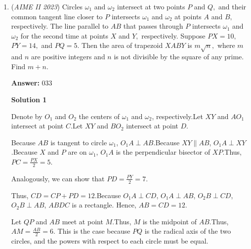 \begin{enumerate}
 Let $x$ be an $n$th root of unity, so $x^n = 1$.

 Factor $a^n - 1$ as $(a-1)(a-x)(a-x^2) \cdots (a-x^{n-1}) \square$.

 For each term in the product, factor out $-1$ in each product to obtain $(-1)^{n}\cdot (1-a)(x-a)(x^2-a)(x^3-a)(...)(x^{n-1}-a)$.

 Because $n=7$, we have the term $(-1)^{7} = -1$.

 Now, note that each $a$ term is a root of unity! This is because $a=1$, and that must correspond to some $x$ power. However, $x$ is also a root of unity! Thus, $a$ must also be a root of unity. Then, because $n=7$, our final rewritten form is $-(a^7-1)$.

 So, for our case

 


	\item (\textit{AIME II 2023}) Circles $\omega_1$ and $\omega_2$ intersect at two points $P$ and $Q,$ and their common tangent line closer to $P$ intersects $\omega_1$ and $\omega_2$ at points $A$ and $B,$ respectively. The line parallel to $AB$ that passes through $P$ intersects $\omega_1$ and $\omega_2$ for the second time at points $X$ and $Y,$ respectively. Suppose $PX=10,$ $PY=14,$ and $PQ=5.$ Then the area of trapezoid $XABY$ is $m\sqrt{n},$ where $m$ and $n$ are positive integers and $n$ is not divisible by the square of any prime. Find $m+n.$

 \textbf{Answer: }033



\textbf{Solution 1}

Denote by $O_1$ and $O_2$ the centers of $\omega_1$ and $\omega_2$, respectively.Let $XY$ and $AO_1$ intersect at point $C$.Let $XY$ and $BO_2$ intersect at point $D$.

 Because $AB$ is tangent to circle $\omega_1$, $O_1 A \perp AB$.Because $XY \parallel AB$, $O_1 A \perp XY$.Because $X$ and $P$ are on $\omega_1$, $O_1A$ is the perpendicular bisector of $XP$.Thus, $PC = \frac{PX}{2} = 5$.

 Analogously, we can show that $PD = \frac{PY}{2} = 7$.

 Thus, $CD = CP + PD = 12$.Because $O_1 A \perp CD$, $O_1 A \perp AB$, $O_2 B \perp CD$, $O_2 B \perp AB$, $ABDC$ is a rectangle. Hence, $AB = CD = 12$.

 Let $QP$ and $AB$ meet at point $M$.Thus, $M$ is the midpoint of $AB$.Thus, $AM = \frac{AB}{2} = 6$. This is the case because $PQ$ is the radical axis of the two circles, and the powers with respect to each circle must be equal.


\end{enumerate}
